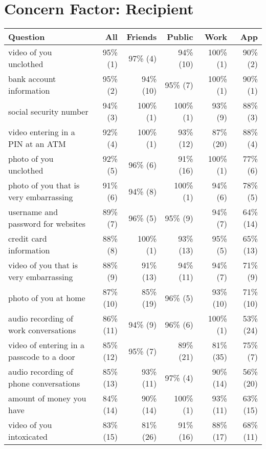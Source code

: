 
\onecolumn
\section{Concern Factor: Recipient}
\label{sec:recipient-appendix} 

\begin{table*}[t]
\begin{center}
\small
\begin{tabular}{| l | r | r | r | r | r |}
\hline
Question & All & Friends & Public & Work& App \\
\hline
video of you unclothed & 95\% (1) & 97\% (4) & 94\% (10) & 100\% (1) & 90\% (2) \\ 
bank account information & 95\% (2) & 94\% (10) & 95\% (7) & 100\% (1) & 90\% (1) \\ 
social security number & 94\% (3) & 100\% (1) & 100\% (1) & 93\% (9) & 88\% (3) \\ 
video entering in a PIN at an ATM & 92\% (4) & 100\% (1) & 93\% (12) & 87\% (20) & 88\% (4) \\ 
photo of you unclothed & 92\% (5) & 96\% (6) & 91\% (16) & 100\% (1) & 77\% (6) \\ 
photo of you that is very embarrassing & 91\% (6) & 94\% (8) & 100\% (1) & 94\% (6) & 78\% (5) \\ 
username and password for websites & 89\% (7) & 96\% (5) & 95\% (9) & 94\% (7) & 64\% (14) \\ 
credit card information & 88\% (8) & 100\% (1) & 93\% (13) & 95\% (5) & 65\% (13) \\ 
video of you that is very embarrassing & 88\% (9) & 91\% (13) & 94\% (11) & 94\% (7) & 71\% (9) \\ 
photo of you at home & 87\% (10) & 85\% (19) & 96\% (5) & 93\% (10) & 71\% (10) \\ 
audio recording of work conversations & 86\% (11) & 94\% (9) & 96\% (6) & 100\% (1) & 53\% (24) \\ 
video of entering in a passcode to a door & 85\% (12) & 95\% (7) & 89\% (21) & 81\% (35) & 75\% (7) \\ 
audio recording of phone conversations & 85\% (13) & 93\% (11) & 97\% (4) & 90\% (14) & 56\% (20) \\ 
amount of money you have & 84\% (14) & 90\% (14) & 100\% (1) & 93\% (11) & 63\% (15) \\ 
video of you intoxicated & 83\% (15) & 81\% (26) & 91\% (16) & 88\% (17) & 68\% (11) \\ 

\end{tabular}
\end{center}
\end{table*}
